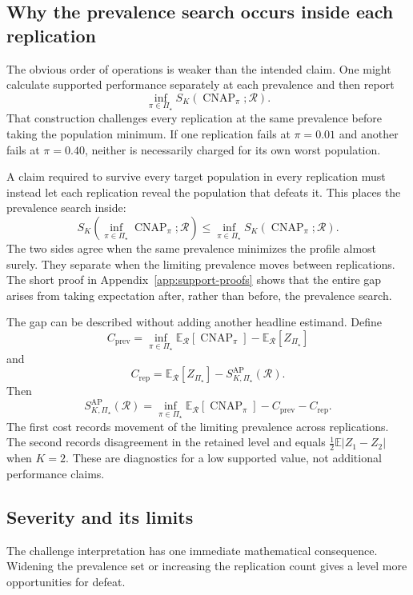 \documentclass[11pt]{article}
\newcommand{\CNAP}{\operatorname{CNAP}}
\newcommand{\Regime}{\mathcal{R}}
\newcommand{\PSet}{\Pi_\star}
\newcommand{\E}{\mathbb{E}}
\newcommand{\SRob}{S_{K,\PSet}^{\mathrm{AP}}(\Regime)}
\theoremstyle{remark}
\begin{document}
\subsection{Why the prevalence search occurs inside each replication}
\label{sec:order}

The obvious order of operations is weaker than the intended claim. One might calculate supported performance separately at each prevalence and then report
\[
\inf_{\pi\in\PSet}
S_K(\CNAP_\pi;\Regime).
\]
That construction challenges every replication at the same prevalence before taking the population minimum. If one replication fails at $\pi=0.01$ and another fails at $\pi=0.40$, neither is necessarily charged for its own worst population.

A claim required to survive every target population in every replication must instead let each replication reveal the population that defeats it. This places the prevalence search inside:
\begin{equation}
S_K\left(
\inf_{\pi\in\PSet}\CNAP_\pi;\Regime
\right)
\leq
\inf_{\pi\in\PSet}
S_K(\CNAP_\pi;\Regime).
\label{eq:order}
\end{equation}
The two sides agree when the same prevalence minimizes the profile almost surely. They separate when the limiting prevalence moves between replications. The short proof in Appendix~\ref{app:support-proofs} shows that the entire gap arises from taking expectation after, rather than before, the prevalence search.

The gap can be described without adding another headline estimand. Define
\[
C_{\mathrm{prev}}
=
\inf_{\pi\in\PSet}\E_{\Regime}[\CNAP_\pi]
-
\E_{\Regime}[Z_{\PSet}]
\]
and
\[
C_{\mathrm{rep}}
=
\E_{\Regime}[Z_{\PSet}]
-\SRob.
\]
Then
\begin{equation}
\SRob
=
\inf_{\pi\in\PSet}\E_{\Regime}[\CNAP_\pi]
-C_{\mathrm{prev}}-C_{\mathrm{rep}}.
\label{eq:costs}
\end{equation}
The first cost records movement of the limiting prevalence across replications. The second records disagreement in the retained level and equals $\tfrac12\E|Z_1-Z_2|$ when $K=2$. These are diagnostics for a low supported value, not additional performance claims.

\subsection{Severity and its limits}

The challenge interpretation has one immediate mathematical consequence. Widening the prevalence set or increasing the replication count gives a level more opportunities for defeat.
\end{document}
